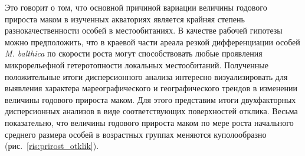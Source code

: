 Это говорит о том, что основной причиной вариации величины годового прироста маком в изученных акваториях является крайняя степень разнокачественности особей в местообитаниях. 
В качестве рабочей гипотезы можно предположить, что в краевой части ареала резкой дифференциации особей {\it M. balthica} по скорости роста могут способствовать любые проявления микрорельефной гетеротопности локальных местообитаний.
Полученные положительные итоги дисперсионного анализа интересно визуализировать для выявления характера мареографического и географического трендов в изменении величины годового прироста маком. 
Для этого представим итоги двухфакторных дисперсионных анализов в виде соответствующих поверхностей отклика.
Весьма показательно, что величины годового прироста маком по мере роста начального среднего размера особей в возрастных группах меняются куполообразно (рис.~\ref{ris:prirost_otklik}). 
